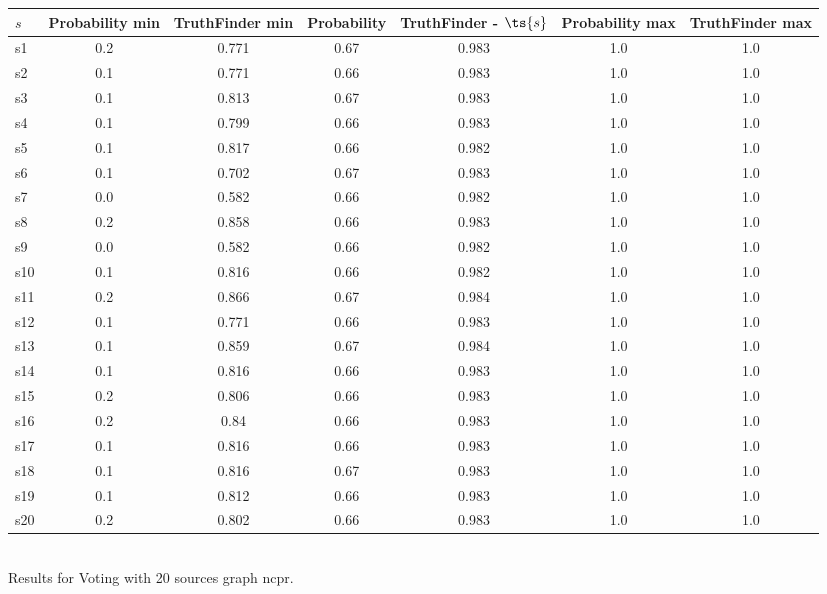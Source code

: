 \documentclass{article}
\begin{document}
\noindent\begin{tabular}{|l|c|c|c|c|c|c|}
\hline
$s$& Probability min & TruthFinder min & Probability & TruthFinder - $\ts{s}$ & Probability max & TruthFinder max\\
\hline
s1 &0.2 & 0.771 & 0.67 & 0.983 & 1.0 & 1.0\\
\hline
s2 &0.1 & 0.771 & 0.66 & 0.983 & 1.0 & 1.0\\
\hline
s3 &0.1 & 0.813 & 0.67 & 0.983 & 1.0 & 1.0\\
\hline
s4 &0.1 & 0.799 & 0.66 & 0.983 & 1.0 & 1.0\\
\hline
s5 &0.1 & 0.817 & 0.66 & 0.982 & 1.0 & 1.0\\
\hline
s6 &0.1 & 0.702 & 0.67 & 0.983 & 1.0 & 1.0\\
\hline
s7 &0.0 & 0.582 & 0.66 & 0.982 & 1.0 & 1.0\\
\hline
s8 &0.2 & 0.858 & 0.66 & 0.983 & 1.0 & 1.0\\
\hline
s9 &0.0 & 0.582 & 0.66 & 0.982 & 1.0 & 1.0\\
\hline
s10 &0.1 & 0.816 & 0.66 & 0.982 & 1.0 & 1.0\\
\hline
s11 &0.2 & 0.866 & 0.67 & 0.984 & 1.0 & 1.0\\
\hline
s12 &0.1 & 0.771 & 0.66 & 0.983 & 1.0 & 1.0\\
\hline
s13 &0.1 & 0.859 & 0.67 & 0.984 & 1.0 & 1.0\\
\hline
s14 &0.1 & 0.816 & 0.66 & 0.983 & 1.0 & 1.0\\
\hline
s15 &0.2 & 0.806 & 0.66 & 0.983 & 1.0 & 1.0\\
\hline
s16 &0.2 & 0.84 & 0.66 & 0.983 & 1.0 & 1.0\\
\hline
s17 &0.1 & 0.816 & 0.66 & 0.983 & 1.0 & 1.0\\
\hline
s18 &0.1 & 0.816 & 0.67 & 0.983 & 1.0 & 1.0\\
\hline
s19 &0.1 & 0.812 & 0.66 & 0.983 & 1.0 & 1.0\\
\hline
s20 &0.2 & 0.802 & 0.66 & 0.983 & 1.0 & 1.0\\
\hline
\end{tabular}\\

\noindent Results for Voting with 20 sources graph ncpr.
\end{document}
